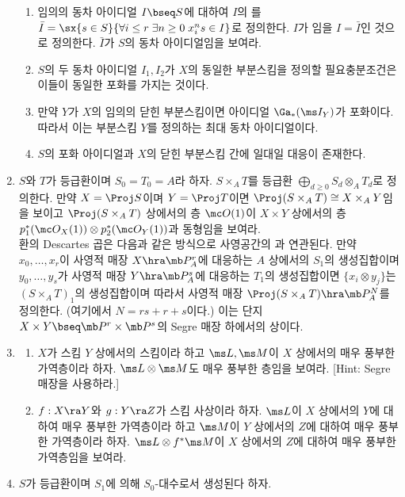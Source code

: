 \begin{enumerate}[label=\tb{5.\arabic*.},itemindent=0mm,itemsep=2mm]
	\begin{enumerate}[label=(\alph*)]
	\item 임의의 동차 아이디얼 $I\bseq S$에 대하여 $I$의 를
	$\bar I=\sx{s\in S}{\forall i\le r\;\exists n\ge 0\;x_i^ns\in I}$로 정의한다.
	$I$가 임을 $I=\bar I$인 것으로 정의한다. $\bar I$가 $S$의 동차 아이디얼임을 보여라.
	\item $S$의 두 동차 아이디얼 $I_1,I_2$가 $X$의 동일한 부분스킴을 정의할 필요충분조건은 이들이 동일한 포화를 가지는 것이다.
	\item 만약 $Y$가 $X$의 임의의 닫힌 부분스킴이면 아이디얼 $\Ga_*(\ms I_Y)$가 포화이다.
	따라서 이는 부분스킴 $Y$를 정의하는 최대 동차 아이디얼이다.
	\item $S$의 포화 아이디얼과 $X$의 닫힌 부분스킴 간에 일대일 대응이 존재한다.
	\end{enumerate}
	\item $S$와 $T$가 등급환이며 $S_0=T_0=A$라 하자.
	 $S\times_AT$를 등급환 $\bigoplus_{d\ge 0}S_d\otimes_AT_d$로 정의한다.
	만약 $X=\Proj S$이며 $Y=\Proj T$이면 $\Proj(S\times_AT)\cong X\times_AY$임을 보이고
	$\Proj(S\times_AT)$ 상에서의 층 $\mc O(1)$이 $X\times Y$ 상에서의 층
	$p_1^*(\mc O_X(1))\otimes p_2^*(\mc O_Y(1))$과 동형임을 보여라.\\
	환의 Descartes 곱은 다음과 같은 방식으로 사영공간의 과 연관된다.
	만약 $x_0,\ldots,x_r$이 사영적 매장 $X\hra\mb P^r_A$에 대응하는 $A$ 상에서의 $S_1$의 생성집합이며
	$y_0,\ldots,y_s$가 사영적 매장 $Y\hra\mb P^s_A$에 대응하는 $T_1$의 생성집합이면
	$\{x_i\otimes y_j\}$는 $(S\times_AT)_1$의 생성집합이며 따라서 사영적 매장 $\Proj(S\times_AT)\hra\mb P^N_A$를 정의한다.
	(여기에서 $N=rs+r+s$이다.) 이는 단지 $X\times Y\bseq\mb P^r\times\mb P^s$의 Segre 매장 하에서의 상이다.
	\item \begin{enumerate}[label=(\alph*)]
	\item $X$가 스킴 $Y$ 상에서의 스킴이라 하고 $\ms L,\ms M$이 $X$ 상에서의 매우 풍부한 가역층이라 하자.
	$\ms L\otimes\ms M$도 매우 풍부한 층임을 보여라. [Hint: Segre 매장을 사용하라.]
	\item $f:X\ra Y$와 $g:Y\ra Z$가 스킴 사상이라 하자. $\ms L$이 $X$ 상에서의 $Y$에 대하여 매우 풍부한 가역층이라 하고
	$\ms M$이 $Y$ 상에서의 $Z$에 대하여 매우 풍부한 가역층이라 하자.
	$\ms L\otimes f^*\ms M$이 $X$ 상에서의 $Z$에 대하여 매우 풍부한 가역층임을 보여라.
	\end{enumerate}
	\item $S$가 등급환이며 $S_1$에 의해 $S_0$-대수로서 생성된다 하자.

\end{enumerate}
